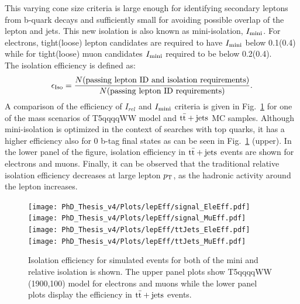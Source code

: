 This varying cone size criteria is large enough for identifying secondary leptons from b-quark decays and sufficiently small for avoiding possible overlap of the lepton and jets. This new isolation is also known as mini-isolation, $I_{\rm mini}$.
For electrons, tight(loose) lepton candidates are required to have $I_{\rm mini}$ below 0.1(0.4) while for tight(loose) muon candidates $I_{\rm mini}$ required to be below 0.2(0.4).\\
The isolation efficiency is defined as:
\begin{eqnarray}
{\epsilon_{\rm Iso}} = {\frac{N({\rm passing\,\,lepton\,\,ID\,\,and\,\,isolation\,\,requirements})}{N({\rm passing\,\,lepton \,\,ID\,\,requirements})}}.
\end{eqnarray}
A comparison of the efficiency of $I_{rel}$ and $I_{\rm mini}$ criteria is given in Fig.~\ref{fig:lep_Eff} for one of the mass scenarios of T5qqqqWW model and ${\rm t\bar{t}+jets}$ MC samples.
Although mini-isolation is optimized in the context of searches with top quarks, it has a higher efficiency also for 0 b-tag final states as can be seen in Fig.~\ref{fig:lep_Eff} (upper).
In the lower panel of the figure, isolation efficiency in ${\rm t\bar{t}+jets}$ events are shown for electrons and muons. 
Finally, it can be observed that the traditional relative isolation efficiency decreases at large lepton $p_{\rm T}$, as the hadronic activity around the lepton increases.
\begin{figure}
\begin{center}
\texttt{[image: PhD\_Thesis\_v4/Plots/lepEff/signal\_EleEff.pdf]}
\texttt{[image: PhD\_Thesis\_v4/Plots/lepEff/signal\_MuEff.pdf]}\\
\texttt{[image: PhD\_Thesis\_v4/Plots/lepEff/ttJets\_EleEff.pdf]}
\texttt{[image: PhD\_Thesis\_v4/Plots/lepEff/ttJets\_MuEff.pdf]}
\caption[Isolation efficiency comparisons]{\label{fig:lep_Eff} Isolation efficiency for simulated events for both of the mini and relative isolation is shown. The upper panel plots show T5qqqqWW (1900,100) model for electrons and muons while the lower panel plots display the efficiency in ${\rm t\bar{t}+jets}$ events.}
\end{center}
\end{figure}
